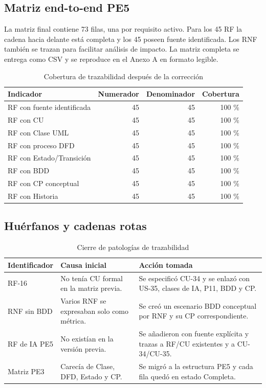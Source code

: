 \documentclass[11pt,a4paper]{article}
\begin{document}
	\subsection{Matriz end-to-end PE5}
	La matriz final contiene 73 filas, una por requisito activo. Para los 45 RF la cadena hacia delante está completa y los 45 poseen fuente identificada. Los RNF también se trazan para facilitar análisis de impacto. La matriz completa se entrega como CSV y se reproduce en el Anexo A en formato legible.
	
	\begin{table}[H]\centering\caption{Cobertura de trazabilidad después de la corrección}\label{tab:trazares}
		\begin{tabular}{lrrr}\toprule\textbf{Indicador}&\textbf{Numerador}&\textbf{Denominador}&\textbf{Cobertura}\\\midrule
			RF con fuente identificada&45&45&100 \%\\
			RF con CU&45&45&100 \%\\
			RF con Clase UML&45&45&100 \%\\
			RF con proceso DFD&45&45&100 \%\\
			RF con Estado/Transición&45&45&100 \%\\
			RF con BDD&45&45&100 \%\\
			RF con CP conceptual&45&45&100 \%\\
			RF con Historia&45&45&100 \%\\\bottomrule\end{tabular}\end{table}
	
	\subsection{Huérfanos y cadenas rotas}
	\begin{table}[H]\centering\caption{Cierre de patologías de trazabilidad}\label{tab:huerfanos}
		\begin{tabularx}{\textwidth}{p{3cm}Y Y}\toprule\textbf{Identificador}&\textbf{Causa inicial}&\textbf{Acción tomada}\\\midrule
			RF-16&No tenía CU formal en la matriz previa.&Se especificó CU-34 y se enlazó con US-35, clases de IA, P11, BDD y CP.\\
			RNF sin BDD&Varios RNF se expresaban solo como métrica.&Se creó un escenario BDD conceptual por RNF y su CP correspondiente.\\
			RF de IA PE5&No existían en la versión previa.&Se añadieron con fuente explícita y trazas a RF/CU existentes y a CU-34/CU-35.\\
			Matriz PE3&Carecía de Clase, DFD, Estado y CP.&Se migró a la estructura PE5 y cada fila quedó en estado Completa.\\\bottomrule\end{tabularx}\end{table}
	
\end{document}
